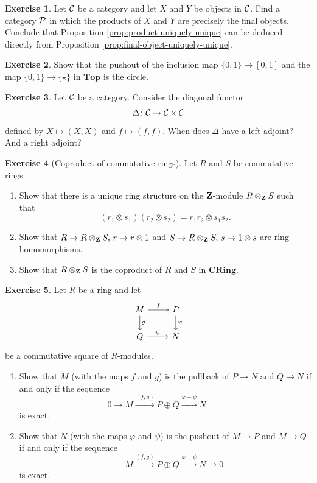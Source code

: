 \documentclass[11pt]{amsbook}
\newcommand{\longto}{\longrightarrow}
\def\Top{\mathbf{Top}}
\def\CRing{\mathbf{CRing}}
\theoremstyle{plain}
\theoremstyle{definition}
\newtheorem{exercise}{Exercise}
\begin{document}
\begin{exercise}\label{exc:product-as-final-object}
Let ${\mathcal{C}}$ be a category and let $X$ and $Y$ be objects in ${\mathcal{C}}$. Find a category ${\mathcal{P}}$ in which the products of $X$ and $Y$ are precisely the final objects. Conclude that Proposition \ref{prop:product-uniquely-unique} can be deduced directly from Proposition  \ref{prop:final-object-uniquely-unique}.
\end{exercise}


\begin{exercise}
Show that the pushout of the inclusion map $\{0,1\} \to [0,1]$ and the map $\{0,1\} \to \{\star\}$ in $\Top$ is the circle.
\end{exercise}

\begin{exercise}
Let ${\mathcal{C}}$ be a category. Consider the diagonal functor 
\[
	\Delta\colon {\mathcal{C}} \to {\mathcal{C}} \times {\mathcal{C}}
\]
defined by $X\mapsto (X,X)$ and $f\mapsto (f,f)$. When does $\Delta$ have a left adjoint? And a right adjoint?
\end{exercise}


\begin{exercise}[Coproduct of commutative rings]
Let $R$ and $S$ be commutative rings.
\begin{enumerate}
\item Show that there is a unique ring structure on the ${\mathbf{Z}}$-module $R\otimes_{\mathbf{Z}} S$ such that
\[
	(r_1 \otimes s_1)(r_2\otimes s_2) = r_1 r_2 \otimes s_1s_2.
\]
\item Show that $R\to R\otimes_{\mathbf{Z}} S,\, r \mapsto r \otimes 1$ and
$S\to R\otimes_{\mathbf{Z}} S,\, s \mapsto 1 \otimes s$ are ring homomorphisms.
\item Show that $R\otimes_{\mathbf{Z}} S$ is the coproduct of $R$ and $S$ in $\CRing$. 
\end{enumerate}
\end{exercise}


\begin{exercise}\label{exc:module-pushout}
Let $R$ be a ring and let
\[
\begin{tikzcd}
	M \arrow{r}{f} \arrow{d}{g} & P \arrow{d}{\varphi} \\
	Q \arrow{r}{\psi} & N 
\end{tikzcd}
\]
be a commutative square of $R$-modules. 
\begin{enumerate}
\item Show that $M$ (with the maps $f$ and $g$) is the pullback of $P\to N$ and $Q\to N$ if and only if the sequence
\[
	0 \longto M \overset{(f,g)}{\longto} P \oplus Q \overset{\varphi-\psi}{\longto} N
	\phantom{\longto 0}
\]
is exact.
\item Show that $N$ (with the maps $\varphi$ and $\psi$) is the pushout of $M\to P$ and $M\to Q$ if and only if the sequence
\[
	\phantom{0\longto} M \overset{(f,g)}{\longto} P \oplus Q \overset{\varphi-\psi}{\longto} N \longto 0
\]
is exact.
\end{enumerate}

\end{exercise}
\end{document}
